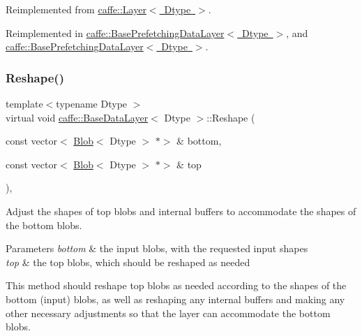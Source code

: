 Reimplemented from \mbox{\hyperlink{classcaffe_1_1_layer_a481323a3e0972c682787f2137468c29f}{caffe\+::\+Layer$<$ Dtype $>$}}.



Reimplemented in \mbox{\hyperlink{classcaffe_1_1_base_prefetching_data_layer_ad3b7914abaa6d46c148864c0e28204ad}{caffe\+::\+Base\+Prefetching\+Data\+Layer$<$ Dtype $>$}}, and \mbox{\hyperlink{classcaffe_1_1_base_prefetching_data_layer_ad3b7914abaa6d46c148864c0e28204ad}{caffe\+::\+Base\+Prefetching\+Data\+Layer$<$ Dtype $>$}}.

\mbox{\label{classcaffe_1_1_base_data_layer_a2955d06a5e67609582fb293a0a37673f}} 
\subsubsection{\texorpdfstring{Reshape()}{Reshape()}\hspace{0.1cm}{\footnotesize\ttfamily [1/2]}}
{\footnotesize\ttfamily template$<$typename Dtype $>$ \\
virtual void \mbox{\hyperlink{classcaffe_1_1_base_data_layer}{caffe\+::\+Base\+Data\+Layer}}$<$ Dtype $>$\+::Reshape (\begin{DoxyParamCaption}\item[{const vector$<$ \mbox{\hyperlink{classcaffe_1_1_blob}{Blob}}$<$ Dtype $>$ $\ast$$>$ \&}]{bottom,  }\item[{const vector$<$ \mbox{\hyperlink{classcaffe_1_1_blob}{Blob}}$<$ Dtype $>$ $\ast$$>$ \&}]{top }\end{DoxyParamCaption})\hspace{0.3cm}{\ttfamily [inline]}, {\ttfamily [virtual]}}



Adjust the shapes of top blobs and internal buffers to accommodate the shapes of the bottom blobs. 


\begin{DoxyParams}{Parameters}
{\em bottom} & the input blobs, with the requested input shapes \\
\hline
{\em top} & the top blobs, which should be reshaped as needed\\
\hline
\end{DoxyParams}
This method should reshape top blobs as needed according to the shapes of the bottom (input) blobs, as well as reshaping any internal buffers and making any other necessary adjustments so that the layer can accommodate the bottom blobs. 

